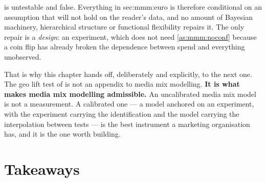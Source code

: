  is untestable and false. Everything in 
{sec:mmm:euro} is therefore conditional on an assumption that will not hold on the reader's data,
and no amount of Bayesian machinery, hierarchical structure or functional flexibility repairs it.
The only repair is a \emph{design}: an experiment, which does not need \cref{as:mmm:noconf} because
a coin flip has already broken the dependence between spend and everything unobserved.

That is why this chapter hands off, deliberately and explicitly, to the next one. The geo lift test
of  is not an appendix to media mix modelling. \textbf{It is what makes media mix
modelling admissible.} An uncalibrated media mix model is not a measurement. A calibrated one --- a
model anchored on an experiment, with the experiment carrying the identification and the model
carrying the interpolation between tests --- is the best instrument a marketing organisation has,
and it is the one worth building.

\section{Takeaways}
\label{sec:mmm:take}

